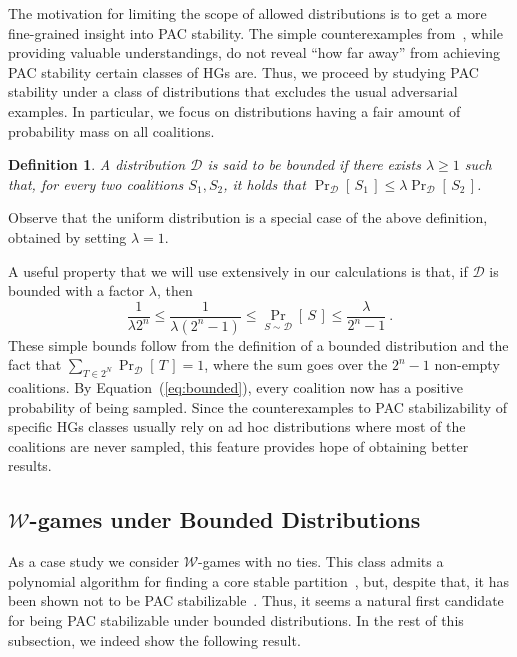 \documentclass[letterpaper]{article} %
\newtheorem{definition}[theorem]{Definition}
\newcommand{\distribution}{\mathcal{D}}
\newcommand{\Prob}[2]{\Pr_{#2}\left[\,#1\,\right]}
\begin{document}
The motivation for limiting the scope of allowed distributions is to get a more fine-grained insight into PAC stability. The simple counterexamples from~\cite{SliwinskiZ17}, while providing valuable understandings, do not reveal ``how far away'' from achieving PAC stability certain classes of HGs are.
Thus, we proceed by studying PAC stability under a class of distributions that excludes the usual adversarial examples. In particular, we focus on distributions having a fair amount of probability mass on all coalitions. 

\begin{definition}\label{def:bounded_dist}
A distribution $\distribution$ is said to be \emph{bounded} if there exists $\lambda \geq 1$ such that, for every two coalitions $S_1, S_2$, it holds that $\Prob{S_1}{\distribution}\leq \lambda \Prob{S_2}{\distribution}$.
\end{definition}
Observe that the uniform distribution is a special case of the above definition, obtained by setting $\lambda=1$. 

A useful property that we will use extensively in our calculations is that, if $\distribution$ is bounded with a factor $\lambda$, then 
\begin{equation}\label{eq:bounded}
    \frac{1}{\lambda 2^n}\le\frac{1}{\lambda(2^n-1)}\leq\Prob{S}{S\sim\distribution}\leq \frac{\lambda}{2^n-1} \ .
\end{equation}
These simple bounds follow from the definition of a bounded distribution and the fact that $\sum_{T\in 2^N} \Prob{T}{\distribution}=1$, where the sum goes over the $2^n-1$ non-empty coalitions.
By Equation~(\ref{eq:bounded}), every coalition now has a positive probability of being sampled. Since the counterexamples to PAC stabilizability of specific HGs classes usually rely on ad hoc distributions where most of the coalitions are never sampled, this feature provides hope of obtaining better results.

\subsection{$\mathcal{W}$-games under Bounded Distributions} \label{sec:w_games}
As a case study we consider $\mathcal{W}$-games with no ties. This class admits a polynomial algorithm for finding a core stable partition~\cite{CechlarovaH04}, but, despite that, it has been shown not to be PAC stabilizable~\cite{SliwinskiZ17}. Thus, it seems a natural first candidate for being PAC stabilizable under bounded distributions. In the rest of this subsection, we indeed show the following result.
\end{document}
